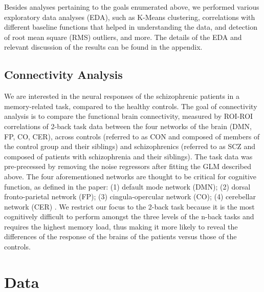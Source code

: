 \documentclass[11pt]{article}
\begin{document}
Besides analyses pertaining to the goals enumerated above, we performed various exploratory data analyses (EDA), such as K-Means clustering, correlations with different baseline functions that helped in understanding the data, and detection of root mean square (RMS) outliers, and more. The details of the EDA and relevant discussion of the results can be found in the appendix. 

\subsection{Connectivity Analysis}

We are interested in the neural responses of the schizophrenic patients in a memory-related task, compared to the healthy controls. The goal of connectivity analysis is to compare the functional brain connectivity, measured by ROI-ROI correlations of 2-back task data between the four networks of the brain (DMN, FP, CO, CER), across controls (referred to as CON and composed of members of the control group and their siblings) and schizophrenics (referred to as SCZ and composed of patients with schizophrenia and their siblings). The task data was pre-precessed by removing the noise regressors after fitting the GLM described above. The four aforementioned networks are thought to be critical for cognitive function, as defined in the paper: (1) default mode network (DMN); (2) dorsal fronto-parietal network (FP); (3) cingula-opercular network (CO); (4) cerebellar network (CER) \cite{repovs2012}. We restrict our focus to the 2-back task because it is the most cognitively difficult to perform amongst the three levels of the n-back tasks and requires the highest memory load, thus making it more likely to reveal the differences of the response of the brains of the patients versus those of the controls. 

\section{Data}
\end{document}

